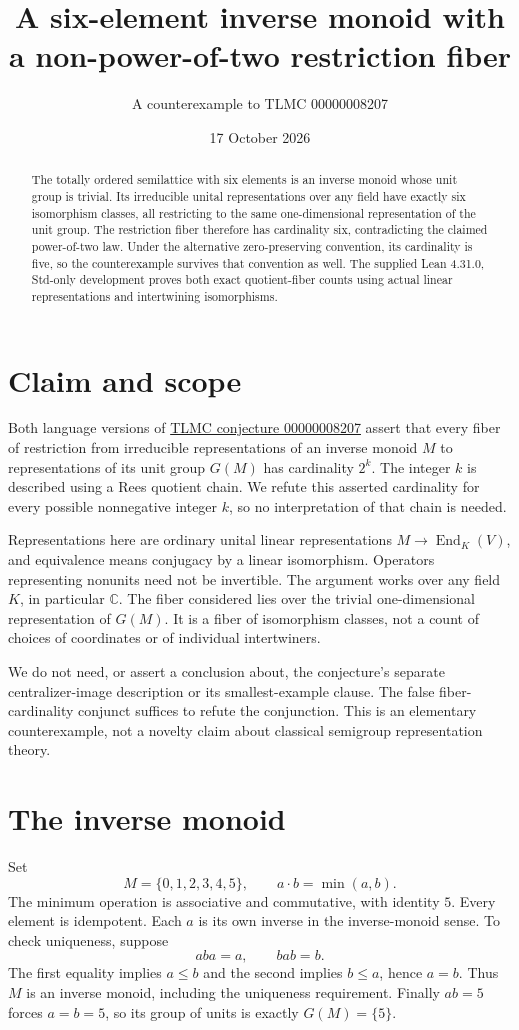 \documentclass[11pt]{article}
\title{A six-element inverse monoid with a non-power-of-two restriction fiber}
\author{A counterexample to TLMC 00000008207}
\date{17 October 2026}
\newcommand{\C}{\mathbb C}
\newcommand{\End}{\operatorname{End}}
\begin{document}
\maketitle
\begin{abstract}
The totally ordered semilattice with six elements is an inverse monoid whose unit group is trivial. Its irreducible unital representations over any field have exactly six isomorphism classes, all restricting to the same one-dimensional representation of the unit group. The restriction fiber therefore has cardinality six, contradicting the claimed power-of-two law. Under the alternative zero-preserving convention, its cardinality is five, so the counterexample survives that convention as well. The supplied Lean 4.31.0, Std-only development proves both exact quotient-fiber counts using actual linear representations and intertwining isomorphisms.
\end{abstract}

\section{Claim and scope}
Both language versions of \href{https://github.com/The-Last-Math-Competition/The-Last-Math-Competition/blob/main/conjectures/00000008207.md}{TLMC conjecture 00000008207} assert that every fiber of restriction from irreducible representations of an inverse monoid $M$ to representations of its unit group $G(M)$ has cardinality $2^k$. The integer $k$ is described using a Rees quotient chain. We refute this asserted cardinality for every possible nonnegative integer $k$, so no interpretation of that chain is needed.

Representations here are ordinary unital linear representations $M\to\End_K(V)$, and equivalence means conjugacy by a linear isomorphism. Operators representing nonunits need not be invertible. The argument works over any field $K$, in particular $\C$. The fiber considered lies over the trivial one-dimensional representation of $G(M)$. It is a fiber of isomorphism classes, not a count of choices of coordinates or of individual intertwiners.

We do not need, or assert a conclusion about, the conjecture's separate centralizer-image description or its smallest-example clause. The false fiber-cardinality conjunct suffices to refute the conjunction. This is an elementary counterexample, not a novelty claim about classical semigroup representation theory.

\section{The inverse monoid}
Set
\[
 M=\{0,1,2,3,4,5\},\qquad a\cdot b=\min(a,b).
\]
The minimum operation is associative and commutative, with identity $5$. Every element is idempotent. Each $a$ is its own inverse in the inverse-monoid sense. To check uniqueness, suppose
\[
 aba=a,\qquad bab=b.
\]
The first equality implies $a\le b$ and the second implies $b\le a$, hence $a=b$. Thus $M$ is an inverse monoid, including the uniqueness requirement. Finally $ab=5$ forces $a=b=5$, so its group of units is exactly $G(M)=\{5\}$.
\end{document}
